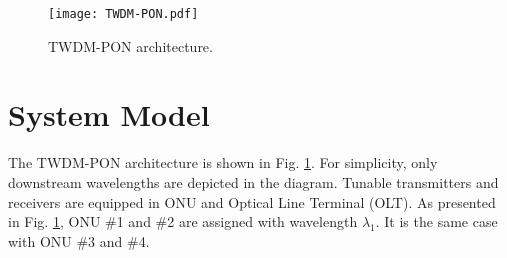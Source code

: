 \documentclass[letter]{IEEEtran}
\begin{document}
%



\begin{figure}
	\centering
	\texttt{[image: TWDM-PON.pdf]}\\
	\caption{TWDM-PON architecture.}
	\label{architecture}
	\vspace{-6.0mm}
\end{figure}
\vspace{-3.0mm}

\section{System Model}
The TWDM-PON architecture is shown in Fig. \ref{architecture}. For simplicity, only downstream wavelengths are depicted in the diagram. Tunable transmitters and receivers are equipped in ONU and Optical Line Terminal (OLT). As presented in Fig. \ref{architecture}, ONU \#1 and \#2 are assigned with wavelength $\lambda_{1}$. It is the same case with ONU \#3 and \#4.
\end{document}

